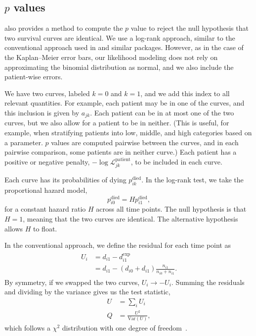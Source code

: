 \documentclass[article]{jss}
\newcommand{\KM}{Kaplan--Meier} %
\begin{document}
\subsection[p values]{\(p\) values}

 also provides a method to compute the \(p\) value to reject the null hypothesis that two survival curves are identical.  We use a log-rank approach, similar to the conventional approach used in  and similar packages.  However, as in the case of the \KM{} error bars, our likelihood modeling does not rely on approximating the binomial distribution as normal, and we also include the patient-wise errors.

We have two curves, labeled \(k=0\) and \(k=1\), and we add this index to all relevant quantities.  For example, each patient may be in one of the curves, and this inclusion is given by \(a_{jk}\).  Each patient can be in at most one of the two curves, but we also allow for a patient to be in neither.  (This is useful, for example, when stratifying patients into low, middle, and high categories based on a parameter\@.  \(p\) values are computed pairwise between the curves, and in each pairwise comparison, some patients are in neither curve.)  Each patient has a positive or negative penalty, \(-\log\mathcal{L}_{jk}^\text{patient}\), to be included in each curve.

Each curve has its probabilities of dying \(p^\text{died}_{ik}\).  In the log-rank test, we take the proportional hazard model,
\begin{equation}
p^\text{died}_{i0} = H p^\text{died}_{i1},
\label{eq:logrank-hazard}
\end{equation}
for a constant hazard ratio \(H\) across all time points.  The null hypothesis is that \(H=1\), meaning that the two curves are identical.  The alternative hypothesis allows \(H\) to float.

In the conventional approach, we define the residual for each time point as
\begin{align}
\begin{aligned}
U_i&=d_{i1} - d_{i1}^\text{exp} \\
&=d_{i1} - (d_{i0} + d_{i1})\frac{n_{i1}}{n_{i0}+n_{i1}}.
\end{aligned}
\end{align}
By symmetry, if we swapped the two curves, \(U_i\rightarrow-U_i\).  Summing the residuals and dividing by the variance gives us the test statistic,
\begin{align}
U&=\sum_i U_i \\
Q&=\frac{U^2}{\text{Var}(U)},
\end{align}
which follows a \(\chi^2\) distribution with one degree of freedom~\citep[pp.~45--47]{mantel1966evaluation,peto1972asymptotically,appliedsurvivalanalysis}.
\end{document}
